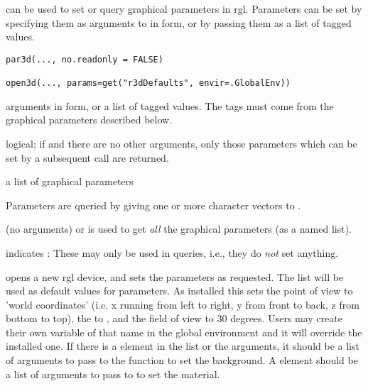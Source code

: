 \begin{Description}\relax
{} can be used to set or query graphical parameters in rgl.
Parameters can be set by specifying them as arguments to  in
 form, or by passing them as a list of tagged
values.
\end{Description}
\begin{Usage}
\begin{verbatim}
par3d(..., no.readonly = FALSE)

open3d(..., params=get("r3dDefaults", envir=.GlobalEnv))

\end{verbatim}
\end{Usage}
\begin{Arguments}
\begin{ldescription}
\item[\code{...}] arguments in  form, or a list of tagged
values.  The tags must come from the graphical parameters described
below.
\item[\code{no.readonly}] logical; if  and there are no other
arguments, only those parameters which can be set by a
subsequent  call are returned.
\item[\code{params}] a list of graphical parameters
\end{ldescription}
\end{Arguments}
\begin{Details}\relax
Parameters are queried by giving one or more character vectors to
.

 (no arguments) or  is used to
get \emph{all} the graphical parameters (as a named list).  

\emph{} indicates \emph{}: These
may only be used in queries, i.e., they do \emph{not} set anything.

 opens a new rgl device, and sets the parameters as
requested.  The  list will be used as default
values for parameters.  As installed this sets the point of view to
'world coordinates' (i.e. x running from left to right, y from front
to back, z from bottom to top), the  to
, and the field of view to 30 degrees.
Users may create their own variable of that name in the global
environment and it will override the installed one.  If there
is a  element in the list or the arguments, it should be
a list of arguments to pass to the  function to 
set the background.  A  element should be a list
of arguments to pass to  to set the material.
\end{Details}
